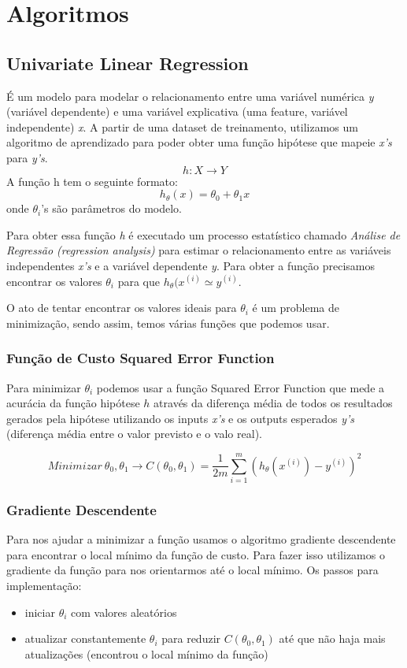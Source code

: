 \documentclass[11pt,a4paper,leqno]{article}
\begin{document}
\newpage
\section{Algoritmos}

\subsection{Univariate Linear Regression}
É um modelo para modelar o relacionamento entre uma variável numérica \emph{y} (variável dependente) e uma variável explicativa (uma feature, variável independente) \emph{x}.
A partir de uma dataset de treinamento, utilizamos um algoritmo de aprendizado para poder obter uma função hipótese que mapeie \emph{x's} para \emph{y's}.
\[h:X \rightarrow Y\]
A função h tem o seguinte formato:
\[ h_\theta(x) = \theta_0 + \theta_1 x \]
onde $\theta_i$'s são parâmetros do modelo.

Para obter essa função \emph{h} é executado um processo estatístico chamado \emph{Análise de Regressão (regression analysis)} para estimar o relacionamento entre as variáveis independentes \emph{x's} e a variável dependente \emph{y}.
Para obter a função precisamos encontrar os valores $\theta_i$ para que $h_\theta (x^{(i)} \simeq y^{(i)}$.

O ato de tentar encontrar os valores ideais para $\theta_i$ é um problema de minimização, sendo assim, temos várias funções que podemos usar.


\subsubsection{Função de Custo Squared Error Function}
Para minimizar $\theta_i$ podemos usar a função Squared Error Function que mede a acurácia da função hipótese $h$ através da diferença média de todos os resultados gerados pela hipótese utilizando os inputs \emph{x's} e os outputs esperados \emph{y's} (diferença média entre o valor previsto e o valo real).

\[
Minimizar \ \theta_0, \theta_1 \rightarrow C (\theta_0, \theta_1) = \frac{1}{2m} \sum_{i=1}^m ( h_\theta (x^{(i)}) - y^{(i)}) ^ 2
\]

\subsubsection{Gradiente Descendente}
Para nos ajudar a minimizar a função usamos o algoritmo gradiente descendente para encontrar o local mínimo da função de custo.
Para fazer isso utilizamos o gradiente da função para nos orientarmos até o local mínimo.
Os passos para implementação:
\begin{itemize}
\item iniciar $\theta_i$ com valores aleatórios
\item atualizar constantemente $\theta_i$ para reduzir $C(\theta_0, \theta_1)$ até que não haja mais atualizações (encontrou o local mínimo da função)
\end{itemize}
\end{document}
